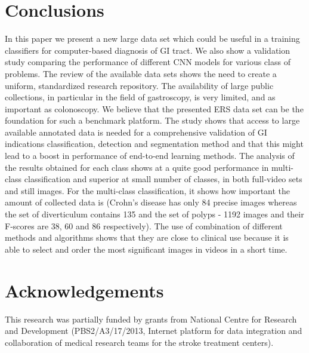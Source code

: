 \documentclass[preprint]{article}
\newif\ifanon
\begin{document}
\section{Conclusions}
In this paper we present a new large data set which could be useful in a training classifiers for computer-based diagnosis of GI tract. We also show a validation study comparing the performance of different CNN models for various class of problems.
The review of the available data sets shows the need to create a uniform, standardized research repository. The availability of large public collections, in particular in the field of gastroscopy, is very limited, and as important as colonoscopy. We believe that the presented ERS data set can be the foundation for such a benchmark platform.
The study shows that access to large available annotated data is needed for a comprehensive validation of GI indications classification, detection and segmentation method and that this might lead to a boost in performance of end-to-end learning methods.
The analysis of the results obtained for each class shows at a quite good performance in multi-class classification and superior at small number of classes, in both full-video sets and still images. 
For the multi-class classification, it shows how important the amount of collected data is (Crohn's disease has only 84 precise images whereas the set of diverticulum contains 135 and the set of polyps - 1192 images and their F-scores are 38, 60 and 86 respectively). 
The use of combination of different methods and algorithms shows that they are close to clinical use because it is able to select and order the most significant images in videos in a short time.







\section*{Acknowledgements}

\ifanon\else
This research was partially funded by grants from National Centre for Research and Development (PBS2/A3/17/2013, Internet platform for data integration and collaboration of medical research teams for the stroke treatment centers).
\fi


\end{document}
